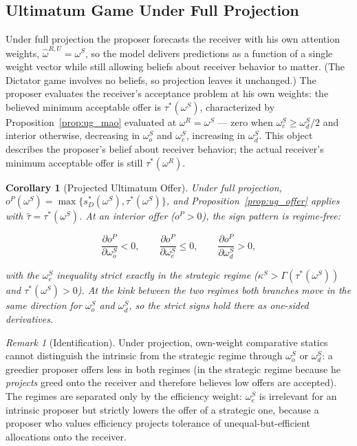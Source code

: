 \documentclass[11pt]{article}
\theoremstyle{plain}
\newtheorem{corollary}{Corollary}
\theoremstyle{remark}
\newtheorem{remark}{Remark}
\begin{document}
\subsection{Ultimatum Game Under Full Projection}

Under full projection the proposer forecasts the receiver with his own attention weights, $\hat\omega^{R,U}=\omega^S$, so the model delivers predictions as a function of a single weight vector while still allowing beliefs about receiver behavior to matter.  (The Dictator game involves no beliefs, so projection leaves it unchanged.)  The proposer evaluates the receiver's acceptance problem at his own weights: the believed minimum acceptable offer is $\tau^\ast(\omega^S)$, characterized by Proposition~\ref{prop:ug_mao} evaluated at $\omega^R=\omega^S$ --- zero when $\omega_e^S\ge\omega_d^S/2$ and interior otherwise, decreasing in $\omega_o^S$ and $\omega_e^S$, increasing in $\omega_d^S$.  This object describes the proposer's belief about receiver behavior; the actual receiver's minimum acceptable offer is still $\tau^\ast(\omega^R)$.

\begin{corollary}[Projected Ultimatum Offer]
\label{cor:ug_projection}
Under full projection, $o^P(\omega^S)=\max\{s_D^\ast(\omega^S),\tau^\ast(\omega^S)\}$, and Proposition~\ref{prop:ug_offer} applies with $\hat\tau=\tau^\ast(\omega^S)$.  At an interior offer ($o^P>0$), the sign pattern is \emph{regime-free}:
\begin{csbox}
\[
        \frac{\partial o^P}{\partial \omega_o^S}<0,
        \qquad
        \frac{\partial o^P}{\partial \omega_e^S}\le0,
        \qquad
        \frac{\partial o^P}{\partial \omega_d^S}>0,
\]
\end{csbox}
with the $\omega_e^S$ inequality strict exactly in the strategic regime ($\kappa^S>\Gamma(\tau^\ast(\omega^S))$ and $\tau^\ast(\omega^S)>0$).  At the kink between the two regimes both branches move in the same direction for $\omega_o^S$ and $\omega_d^S$, so the strict signs hold there as one-sided derivatives.
\end{corollary}

\begin{remark}[Identification]
Under projection, own-weight comparative statics cannot distinguish the intrinsic from the strategic regime through $\omega_o^S$ or $\omega_d^S$: a greedier proposer offers less in both regimes (in the strategic regime because he \emph{projects} greed onto the receiver and therefore believes low offers are accepted).  The regimes are separated only by the efficiency weight: $\omega_e^S$ is irrelevant for an intrinsic proposer but strictly lowers the offer of a strategic one, because a proposer who values efficiency projects tolerance of unequal-but-efficient allocations onto the receiver.
\end{remark}
\end{document}
